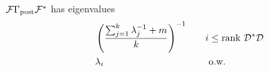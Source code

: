 \documentclass{beamer}
\begin{document}


\begin{frame}
  \begin{theorem}[D.]
    \( \mathcal{F} \Gamma_{\textup{post}} \mathcal{F}^*\)
    has eigenvalues 
    \begin{align*}
      &\left(\frac{\sum_{j=1}^k \lambda_j^{-1} + m}{k} \right )^{-1} &&\quad i \leq \textup{rank}\  \mathcal{D}^*\mathcal{D} \\
      &\lambda_i  &&\quad \text{ o.w.}
    \end{align*}
  \end{theorem}
\end{frame}
\end{document}
